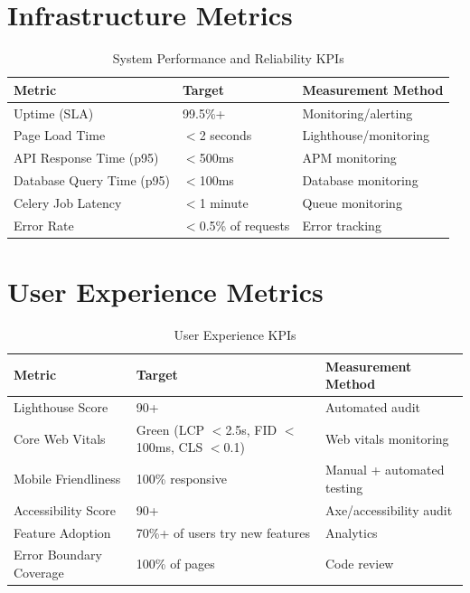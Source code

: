 \documentclass[12pt,oneside]{report}
\begin{document}
\section{Infrastructure Metrics}

\begin{table}[h]
\centering
\caption{System Performance and Reliability KPIs}
\begin{tabular}{|p{3.5cm}|p{2.5cm}|p{3cm}|}
\hline
\rowcolor{lightblue}
\textbf{Metric} & \textbf{Target} & \textbf{Measurement Method} \\
\hline
Uptime (SLA) & 99.5\%+ & Monitoring/alerting \\
\hline
Page Load Time & $<$2 seconds & Lighthouse/monitoring \\
\hline
API Response Time (p95) & $<$500ms & APM monitoring \\
\hline
Database Query Time (p95) & $<$100ms & Database monitoring \\
\hline
Celery Job Latency & $<$1 minute & Queue monitoring \\
\hline
Error Rate & $<$0.5\% of requests & Error tracking \\
\hline
\end{tabular}
\end{table}

\section{User Experience Metrics}

\begin{table}[h]
\centering
\caption{User Experience KPIs}
\begin{tabular}{|p{3.5cm}|p{2.5cm}|p{3cm}|}
\hline
\rowcolor{lightblue}
\textbf{Metric} & \textbf{Target} & \textbf{Measurement Method} \\
\hline
Lighthouse Score & 90+ & Automated audit \\
\hline
Core Web Vitals & Green (LCP $<$2.5s, FID $<$100ms, CLS $<$0.1) & Web vitals monitoring \\
\hline
Mobile Friendliness & 100\% responsive & Manual + automated testing \\
\hline
Accessibility Score & 90+ & Axe/accessibility audit \\
\hline
Feature Adoption & 70\%+ of users try new features & Analytics \\
\hline
Error Boundary Coverage & 100\% of pages & Code review \\
\hline
\end{tabular}
\end{table}
\end{document}
